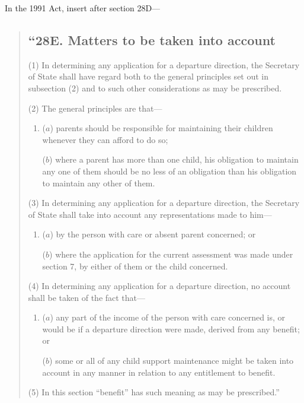 \documentclass[a4paper]{article}
\begin{document}
In the 1991 Act, insert after section 28D—
\begin{quotation}
\subsection*{“28E. Matters to be taken into account}

(1) In determining any application for a departure direction, the Secretary of State shall have regard both to the general principles set out in subsection (2) and to such other considerations as may be prescribed.

(2) The general principles are that—
\begin{enumerate}\item[]
($a$) parents should be responsible for maintaining their children whenever they can afford to do so;

($b$) where a parent has more than one child, his obligation to maintain any one of them should be no less of an obligation than his obligation to maintain any other of them.
\end{enumerate}

(3) In determining any application for a departure direction, the Secretary of State shall take into account any representations made to him—
\begin{enumerate}\item[]
($a$) by the person with care or absent parent concerned; or

($b$) where the application for the current assessment was made under section 7, by either of them or the child concerned.
\end{enumerate}

(4) In determining any application for a departure direction, no account shall be taken of the fact that—
\begin{enumerate}\item[]
($a$) any part of the income of the person with care concerned is, or would be if a departure direction were made, derived from any benefit; or

($b$) some or all of any child support maintenance might be taken into account in any manner in relation to any entitlement to benefit.
\end{enumerate}

(5) In this section “benefit” has such meaning as may be prescribed.” 
\end{quotation}
\end{document}
